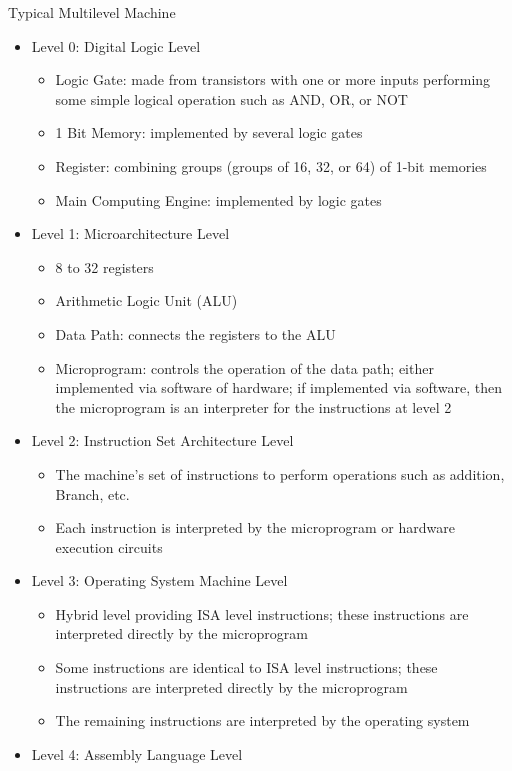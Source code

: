 \documentclass[12pt]{article}
\begin{document}
Typical Multilevel Machine \begin{itemize} 
\item Level 0: Digital Logic Level \begin{itemize} 
\item Logic Gate: made from transistors with one or more inputs performing some simple logical operation such as AND, OR, or NOT
\item 1 Bit Memory: implemented by several logic gates 
\item Register: combining groups (groups of 16, 32, or 64) of 1-bit memories 
\item Main Computing Engine: implemented by logic gates 
\end{itemize} 
\item Level 1: Microarchitecture Level \begin{itemize} 
\item 8 to 32 registers 
\item Arithmetic Logic Unit (ALU)
\item Data Path: connects the registers to the ALU 
\item Microprogram: controls the operation of the data path; either implemented via software of hardware; if implemented via software, then the microprogram is an interpreter for the instructions at level 2 
\end{itemize} 
\item Level 2: Instruction Set Architecture Level \begin{itemize} 
\item The machine's set of instructions to perform operations such as addition, Branch, etc.
\item Each instruction is interpreted by the microprogram or hardware execution circuits
\end{itemize} 
\item Level 3: Operating System Machine Level \begin{itemize} 
\item Hybrid level providing ISA level instructions; these instructions are interpreted directly by the microprogram 
\item Some instructions are identical to ISA level instructions; these instructions are interpreted directly by the microprogram
\item The remaining instructions are interpreted by the operating system
\end{itemize} 
\item Level 4: Assembly Language Level \begin{itemize} 

\end{itemize}
\end{itemize}
\end{document}
